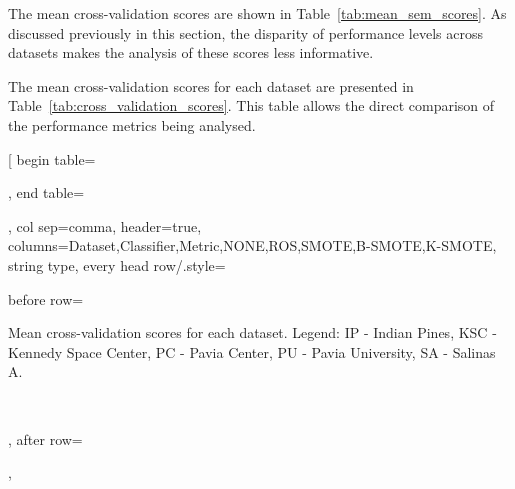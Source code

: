 \documentclass[information,article,submit,moreauthors,pdftex]{Definitions/mdpi}
\begin{document}
\captionsetup{justification=centering}
\begin{paracol}{2}
\linenumbers
\switchcolumn

The mean cross-validation scores are shown in Table~\ref{tab:mean_sem_scores}.
As discussed previously in this section, the disparity of performance levels
across datasets makes the analysis of these scores less informative.

\end{paracol}
\captionsetup{justification=centering}
\begin{paracol}{2}
\linenumbers
\switchcolumn

The mean cross-validation scores for each dataset are presented in
Table~\ref{tab:cross_validation_scores}. This table allows the direct
comparison of the performance metrics being analysed.

\end{paracol}
\captionsetup{justification=centering}
\pgfplotstabletypeset[
	begin table=\begin{longtable},
	end table=\end{longtable},
	col sep=comma,
	header=true,
	columns={Dataset,Classifier,Metric,NONE,ROS,SMOTE,B-SMOTE,K-SMOTE}, 
    string type,
    every head row/.style={before row={
            \caption{Mean cross-validation scores 
            for each dataset.  Legend: IP - Indian Pines, KSC - Kennedy
            Space Center, PC - Pavia Center, PU - Pavia University, SA -
            Salinas A.
        }\label{tab:cross_validation_scores}\\
    \toprule}, after row=\midrule\endhead},
\end{document}
